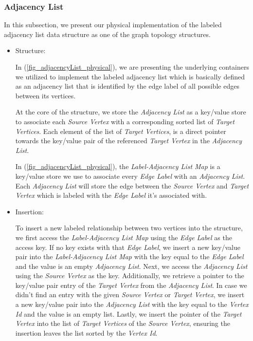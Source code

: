 {\subsubsection{Adjacency List}
\label{adjList_physical}

In this subsection, we present our physical implementation of the labeled adjacency list data structure as one of the graph topology structures.

\begin{itemize}

\item{Structure:}

In (\ref{fig_adjacencyList_physical}), we are presenting the underlying containers we utilized to implement the labeled adjacency list which is basically defined as an adjacency list that is identified by the edge label of all possible edges between its vertices.

At the core of the structure, we store the \textit{Adjacency List} as a key/value store to associate each \textit{Source Vertex} with a corresponding sorted list of \textit{Target Vertices}. Each element of the list of \textit{Target Vertices}, is a direct pointer towards the key/value pair of the referenced \textit{Target Vertex} in the \textit{Adjacency List}.

In (\ref{fig_adjacencyList_physical}), the \textit{Label-Adjacency List Map} is a key/value store we use to associate every \textit{Edge Label} with an \textit{Adjacency List}. Each \textit{Adjacency List} will store the edge between the \textit{Source Vertex} and \textit{Target Vertex} which is labeled with the \textit{Edge Label} it's associated with.

\item{Insertion:}

To insert a new labeled relationship between two vertices into the structure, we first access the \textit{Label-Adjacency List Map} using the \textit{Edge Label} as the access key. If no key exists with that \textit{Edge Label}, we insert a new key/value pair into the \textit{Label-Adjacency List Map} with the key equal to the \textit{Edge Label} and the value is an empty \textit{Adjacency List}. Next, we access the \textit{Adjacency List} using the \textit{Source Vertex} as the key. Additionally, we retrieve a pointer to the key/value pair entry of the \textit{Target Vertex} from the \textit{Adjacency List}. In case we didn't find an entry with the given \textit{Source Vertex} or \textit{Target Vertex}, we insert a new key/value pair into the \textit{Adjacency List} with the key equal to the \textit{Vertex Id} and the value is an empty list. Lastly, we insert the pointer of the \textit{Target Vertex} into the list of \textit{Target Vertices} of the \textit{Source Vertex}, ensuring the insertion leaves the list sorted by the \textit{Vertex Id}.


\end{itemize}}
